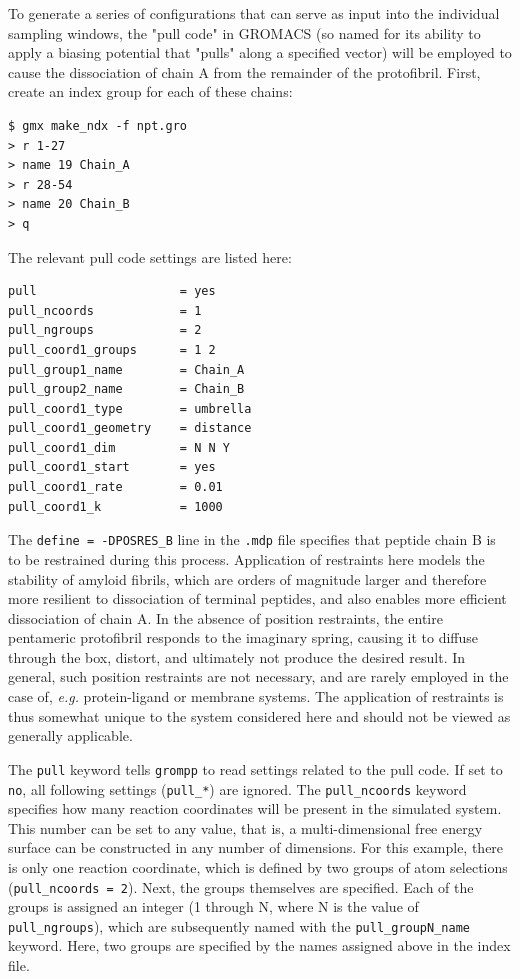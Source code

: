 \documentclass[9pt,tutorial,pubversion]{livecoms}
\begin{document}
To generate a series of configurations that can serve as input into the individual sampling windows, the "pull code" in GROMACS (so named for its ability to apply a biasing potential that "pulls" along a specified vector) will be employed to cause the dissociation of chain A from the remainder of the protofibril. First, create an index group for each of these chains:

\begin{lstlisting}
$ gmx make_ndx -f npt.gro
> r 1-27
> name 19 Chain_A
> r 28-54
> name 20 Chain_B
> q
\end{lstlisting}

The relevant pull code settings are listed here:

\begin{lstlisting}
pull                    = yes
pull_ncoords            = 1
pull_ngroups            = 2
pull_coord1_groups      = 1 2
pull_group1_name        = Chain_A
pull_group2_name        = Chain_B
pull_coord1_type        = umbrella
pull_coord1_geometry    = distance
pull_coord1_dim         = N N Y
pull_coord1_start       = yes
pull_coord1_rate        = 0.01
pull_coord1_k           = 1000
\end{lstlisting}

The \texttt{define = -DPOSRES\_B} line in the \texttt{.mdp} file specifies that peptide chain B is to be restrained during this process. Application of restraints here models the stability of amyloid fibrils, which are orders of magnitude larger and therefore more resilient to dissociation of terminal peptides, and also enables more efficient dissociation of chain A. In the absence of position restraints, the entire pentameric protofibril responds to the imaginary spring, causing it to diffuse through the box, distort, and ultimately not produce the desired result. In general, such position restraints are not necessary, and are rarely employed in the case of, {\em e.g.} protein-ligand or membrane systems. The application of restraints is thus somewhat unique to the system considered here and should not be viewed as generally applicable.

The \texttt{pull} keyword tells \texttt{grompp} to read settings related to the pull code. If set to \texttt{no}, all following settings (\texttt{pull\_*}) are ignored. The \texttt{pull\_ncoords} keyword specifies how many reaction coordinates will be present in the simulated system. This number can be set to any value, that is, a multi-dimensional free energy surface can be constructed in any number of dimensions. For this example, there is only one reaction coordinate, which is defined by two groups of atom selections (\texttt{pull\_ncoords = 2}). Next, the groups themselves are specified. Each of the groups is assigned an integer (1 through N, where N is the value of \texttt{pull\_ngroups}), which are subsequently named with the \texttt{pull\_groupN\_name} keyword. Here, two groups are specified by the names assigned above in the index file.
\end{document}
